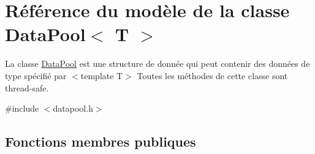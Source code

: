 \hypertarget{class_data_pool}{\section{Référence du modèle de la classe Data\+Pool$<$ T $>$}
\label{class_data_pool}
}


La classe \hyperlink{class_data_pool}{Data\+Pool} est une structure de donnée qui peut contenir des données de type spécifié par $<$template T$>$ Toutes les méthodes de cette classe sont thread-\/safe.  




{\ttfamily \#include $<$datapool.\+h$>$}

\subsection*{Fonctions membres publiques}
